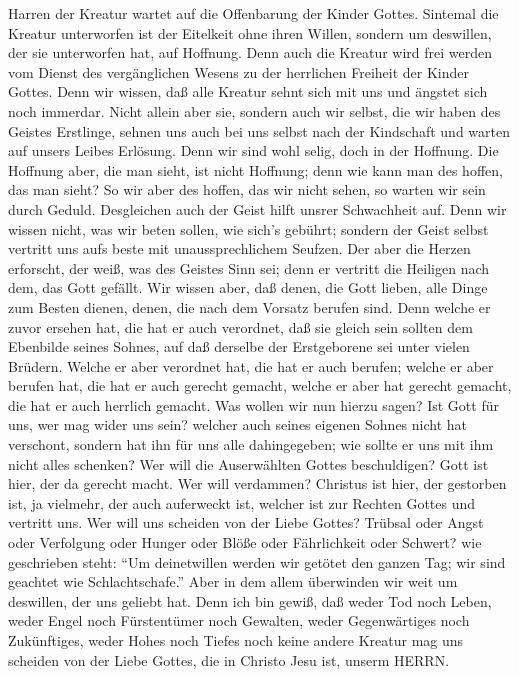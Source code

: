 Harren der Kreatur wartet auf die Offenbarung der Kinder Gottes.
 Sintemal die Kreatur unterworfen ist der Eitelkeit ohne
ihren Willen, sondern um deswillen, der sie unterworfen hat, auf
Hoffnung.  Denn auch die Kreatur wird frei werden vom
Dienst des vergänglichen Wesens zu der herrlichen Freiheit der Kinder
Gottes.  Denn wir wissen, daß alle Kreatur sehnt sich mit
uns und ängstet sich noch immerdar.  Nicht allein aber sie,
sondern auch wir selbst, die wir haben des Geistes Erstlinge, sehnen uns
auch bei uns selbst nach der Kindschaft und warten auf unsers Leibes
Erlösung.  Denn wir sind wohl selig, doch in der Hoffnung.
Die Hoffnung aber, die man sieht, ist nicht Hoffnung; denn wie kann man
des hoffen, das man sieht?  So wir aber des hoffen, das wir
nicht sehen, so warten wir sein durch Geduld.  Desgleichen
auch der Geist hilft unsrer Schwachheit auf. Denn wir wissen nicht, was
wir beten sollen, wie sich's gebührt; sondern der Geist selbst vertritt
uns aufs beste mit unaussprechlichem Seufzen.  Der aber die
Herzen erforscht, der weiß, was des Geistes Sinn sei; denn er vertritt
die Heiligen nach dem, das Gott gefällt.  Wir wissen aber,
daß denen, die Gott lieben, alle Dinge zum Besten dienen, denen, die
nach dem Vorsatz berufen sind.  Denn welche er zuvor
ersehen hat, die hat er auch verordnet, daß sie gleich sein sollten dem
Ebenbilde seines Sohnes, auf daß derselbe der Erstgeborene sei unter
vielen Brüdern.  Welche er aber verordnet hat, die hat er
auch berufen; welche er aber berufen hat, die hat er auch gerecht
gemacht, welche er aber hat gerecht gemacht, die hat er auch herrlich
gemacht.  Was wollen wir nun hierzu sagen? Ist Gott für
uns, wer mag wider uns sein?  welcher auch seines eigenen
Sohnes nicht hat verschont, sondern hat ihn für uns alle dahingegeben;
wie sollte er uns mit ihm nicht alles schenken?  Wer will
die Auserwählten Gottes beschuldigen? Gott ist hier, der da gerecht
macht.  Wer will verdammen? Christus ist hier, der
gestorben ist, ja vielmehr, der auch auferweckt ist, welcher ist zur
Rechten Gottes und vertritt uns.  Wer will uns scheiden von
der Liebe Gottes? Trübsal oder Angst oder Verfolgung oder Hunger oder
Blöße oder Fährlichkeit oder Schwert?  wie geschrieben
steht: ``Um deinetwillen werden wir getötet den ganzen Tag; wir sind
geachtet wie Schlachtschafe.''  Aber in dem allem
überwinden wir weit um deswillen, der uns geliebt hat. 
Denn ich bin gewiß, daß weder Tod noch Leben, weder Engel noch
Fürstentümer noch Gewalten, weder Gegenwärtiges noch Zukünftiges,
 weder Hohes noch Tiefes noch keine andere Kreatur mag uns
scheiden von der Liebe Gottes, die in Christo Jesu ist, unserm HERRN.


